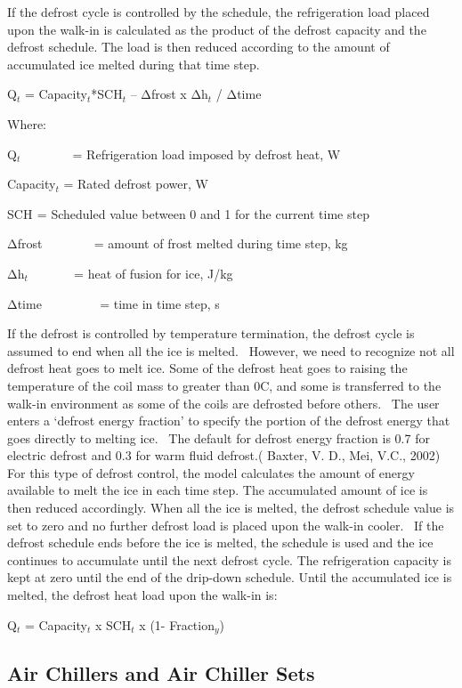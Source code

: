If the defrost cycle is controlled by the schedule, the refrigeration load placed upon the walk-in is calculated as the product of the defrost capacity and the defrost schedule. The load is then reduced according to the amount of accumulated ice melted during that time step.

Q\(_{t}\) = Capacity\(_{t}\)*SCH\(_{t}\) -- Δfrost x Δh\(_{t}\) / Δtime

Where:

Q\(_{t}\) ~~~~~~~ = Refrigeration load imposed by defrost heat, W

Capacity\(_{t}\) = Rated defrost power, W

SCH\(_{ }\) = Scheduled value between 0 and 1 for the current time step

Δfrost ~~~~~~~ = amount of frost melted during time step, kg

Δh\(_{t}\) ~~~~~~ = heat of fusion for ice, J/kg

Δtime ~~~~~~~~ = time in time step, s

If the defrost is controlled by temperature termination, the defrost cycle is assumed to end when all the ice is melted.~ However, we need to recognize not all defrost heat goes to melt ice. Some of the defrost heat goes to raising the temperature of the coil mass to greater than 0C, and some is transferred to the walk-in environment as some of the coils are defrosted before others.~ The user enters a `defrost energy fraction' to specify the portion of the defrost energy that goes directly to melting ice.~ The default for defrost energy fraction is 0.7 for electric defrost and 0.3 for warm fluid defrost.( Baxter, V. D., Mei, V.C., 2002) For this type of defrost control, the model calculates the amount of energy available to melt the ice in each time step. The accumulated amount of ice is then reduced accordingly. When all the ice is melted, the defrost schedule value is set to zero and no further defrost load is placed upon the walk-in cooler.~ If the defrost schedule ends before the ice is melted, the schedule is used and the ice continues to accumulate until the next defrost cycle. The refrigeration capacity is kept at zero until the end of the drip-down schedule. Until the accumulated ice is melted, the defrost heat load upon the walk-in is:

Q\(_{t}\) = Capacity\(_{t}\) x SCH\(_{t}\) x (1- Fraction\(_{y}\))

\subsection{Air Chillers and Air Chiller Sets}\label{air-chillers-and-air-chiller-sets}

